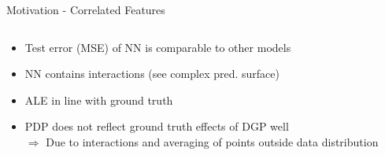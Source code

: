 \documentclass[11pt,compress,t,notes=noshow, aspectratio=169, xcolor=table]{beamer}
\begin{document}
\begin{frame}{Motivation - Correlated Features}
\begin{columns}[T]
\begin{column}{0.35\textwidth}
\begin{itemize}
\item Test error (MSE) of NN is comparable to other models
\item NN contains interactions (see complex pred. surface)
\item<2> ALE in line with ground truth
\item<2> PDP does not reflect ground truth effects of DGP well \\
$\Rightarrow$ Due to interactions and averaging of points outside data distribution
\end{itemize}

\end{column}
\end{columns}

\end{frame}
\end{document}
